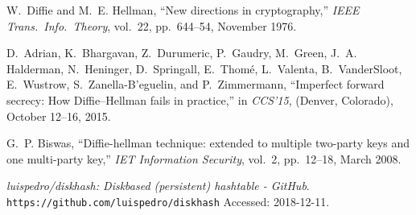 \documentclass[11pt]{article}
\begin{document}
\begin{thebibliography}{99}

W.~Diffie and M.~E. Hellman, ``New directions in cryptography,'' {\em IEEE
  Trans.\ Info.\ Theory}, vol.~22, pp.~644--54, November 1976.

D.~Adrian, K.~Bhargavan, Z.~Durumeric, P.~Gaudry, M.~Green, J.~A. Halderman,
  N.~Heninger, D.~Springall, E.~Thom\'{e}, L.~Valenta, B.~VanderSloot,
  E.~Wustrow, S.~Zanella-B'{e}guelin, and P.~Zimmermann, ``Imperfect forward
  secrecy: How {Diffie--Hellman} fails in practice,'' in {\em CCS'15}, (Denver,
  Colorado), October 12--16, 2015.

G.~P. Biswas, ``Diffie-hellman technique: extended to multiple two-party keys
  and one multi-party key,'' {\em IET Information Security}, vol.~2,
  pp.~12--18, March 2008.

{\em luispedro/diskhash: Diskbased (persistent) hashtable - GitHub}.
  \verb|https://github.com/luispedro/diskhash|
  \newblock Accessed: 2018-12-11.

\end{thebibliography}
\end{document}
